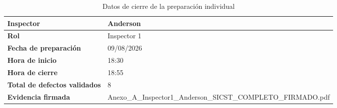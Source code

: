 \documentclass[12pt,a4paper]{article}
\begin{document}
\begin{table}[htbp]
\centering
\caption{Datos de cierre de la preparación individual}
\label{tab:cierre-anderson}
\renewcommand{\arraystretch}{1.25}
\begin{tabularx}{0.92\textwidth}{|>{\bfseries}p{4cm}|X|}
\hline
Inspector & Anderson \\ \hline
Rol & Inspector 1 \\ \hline
Fecha de preparación & 09/08/2026 \\ \hline
Hora de inicio & 18:30 \\ \hline
Hora de cierre & 18:55 \\ \hline
Total de defectos validados & 8 \\ \hline
Evidencia firmada & Anexo\_A\_Inspector1\_Anderson\_SICST\_COMPLETO\_FIRMADO.pdf \\ \hline
\end{tabularx}
\end{table}


\clearpage
\printbibliography[title={Referencias}]
\end{document}
